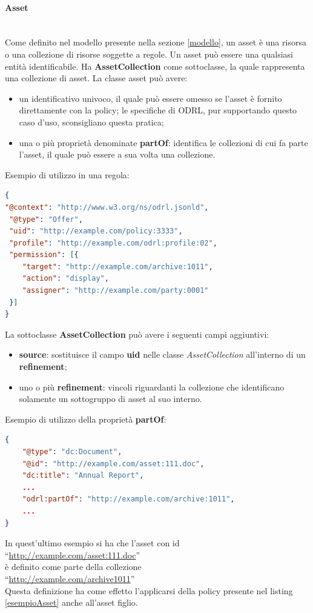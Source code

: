 \documentclass[12pt,a4paper,twoside]{book}
\begin{document}
\paragraph{Asset}\mbox{}\\
Come definito nel modello presente nella sezione \ref{modello}, un asset è una risorsa o una collezione di risorse soggette a regole. Un asset può essere una qualsiasi entità identificabile. Ha \textbf{AssetCollection} come sottoclasse, la quale rappresenta una collezione di asset. La classe asset può avere:
\begin{itemize}
\item un identificativo univoco, il quale può essere omesso se l'asset è fornito direttamente con la policy; le specifiche di ODRL, pur supportando questo caso d'uso, sconsigliano questa pratica;
\item una o più proprietà denominate \textbf{partOf}: identifica le collezioni di cui fa parte l'asset, il quale può essere a sua volta una collezione.
\end{itemize}
Esempio di utilizzo in una regola:
\begin{lstlisting}[language=json,firstnumber=1,caption={Utilizzo di asset nella proprietà \textbf{target} di una regola},captionpos=b,label=esempioAsset]
{
"@context": "http://www.w3.org/ns/odrl.jsonld",
 "@type": "Offer",
 "uid": "http://example.com/policy:3333",
 "profile": "http://example.com/odrl:profile:02",
 "permission": [{
	"target": "http://example.com/archive:1011",
	"action": "display",
	"assigner": "http://example.com/party:0001"
 }]
}
\end{lstlisting}
La sottoclasse \textbf{AssetCollection} può avere i seguenti campi aggiuntivi:
\begin{itemize}
	\item \textbf{source}: sostituisce il campo \textbf{uid} nelle classe \textit{AssetCollection} all'interno di un \textbf{refinement};
	\item uno o più \textbf{refinement}: vincoli riguardanti la collezione che identificano solamente un sottogruppo di asset al suo interno.
\end{itemize}
\newpage
Esempio di utilizzo della proprietà \textbf{partOf}:
\begin{lstlisting}[language=json,firstnumber=1,caption={L'asset definito è parte del target presente nel listing \ref{esempioAsset}},captionpos=b,label=esempioAssetColl]
{
	"@type": "dc:Document",
	"@id": "http://example.com/asset:111.doc",
	"dc:title": "Annual Report",
	...
	"odrl:partOf": "http://example.com/archive:1011",
	...
}
\end{lstlisting}
In quest'ultimo esempio si ha che l'asset con id \\``\url{http://example.com/asset:111.doc}''\\è definito come parte della collezione\\``\url{http://example.com/archive1011}''\\Questa definizione ha come effetto l'applicarsi della policy presente nel listing \ref{esempioAsset} anche all'asset figlio.
\end{document}
